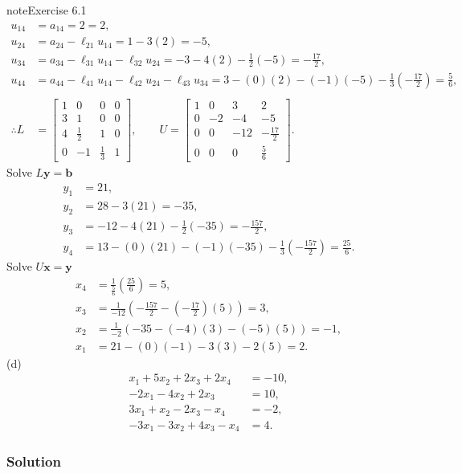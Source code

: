 \documentclass[letterpaper,10pt,english]{jupyterBook}
\begin{document}
\begin{sphinxadmonition}{note}{Exercise 6.1}
\begin{align*}
    u_{14} &= a_{14} = 2 = 2, \\
    u_{24} &= a_{24} - \ell_{21} u_{14} = 1 - 3\left(2\right) = -5, \\
    u_{34} &= a_{34} - \ell_{31} u_{14} - \ell_{32} u_{24} = -3 - 4\left(2\right) - \frac{1}{2}\left(-5\right) = - \frac{17}{2}, \\
    u_{44} &= a_{44} - \ell_{41} u_{14} - \ell_{42} u_{24} - \ell_{43} u_{34} = 3 - \left(0\right)\left(2\right) - \left(-1\right)\left(-5\right) - \frac{1}{3}\left(- \frac{17}{2}\right) = \frac{5}{6}, \\
    \\
    \therefore L &= \left[\begin{matrix}1 & 0 & 0 & 0\\3 & 1 & 0 & 0\\4 & \frac{1}{2} & 1 & 0\\0 & -1 & \frac{1}{3} & 1\end{matrix}\right], \qquad
    U = \left[\begin{matrix}1 & 0 & 3 & 2\\0 & -2 & -4 & -5\\0 & 0 & -12 & - \frac{17}{2}\\0 & 0 & 0 & \frac{5}{6}\end{matrix}\right].
\end{align*}
\sphinxAtStartPar
Solve \(L \mathbf{{y}} = \mathbf{{b}}\)
\begin{align*}
    y_{1} &= 21, \\
    y_{2} &= 28 - 3\left(21\right) = -35, \\
    y_{3} &= -12 - 4\left(21\right) - \frac{1}{2}\left(-35\right) = - \frac{157}{2}, \\
    y_{4} &= 13 - \left(0\right)\left(21\right) - \left(-1\right)\left(-35\right) - \frac{1}{3}\left(- \frac{157}{2}\right) = \frac{25}{6}.
\end{align*}
\sphinxAtStartPar
Solve \(U \mathbf{{x}} = \mathbf{{y}}\)
\begin{align*}
    x_{4} &= \frac{1}{\frac{5}{6}}\left(\frac{25}{6}\right) = 5, \\
    x_{3} &= \frac{1}{-12}\left(- \frac{157}{2} - \left(- \frac{17}{2}\right)\left(5\right)\right) = 3, \\
    x_{2} &= \frac{1}{-2}\left(-35 - \left(-4\right)\left(3\right) - \left(-5\right)\left(5\right)\right) = -1, \\
    x_{1} &= 21 - \left(0\right)\left(-1\right) - 3\left(3\right) - 2\left(5\right) = 2.
\end{align*}
\sphinxAtStartPar
(d)
\begin{align*}
        x_1 + 5 x_2 + 2 x_3 + 2 x_4 &= -10,\\
    - 2 x_1 - 4 x_2 + 2 x_3         &=  10,\\
      3 x_1 +   x_2 - 2 x_3 -   x_4 &= -2,\\
    - 3 x_1 - 3 x_2 + 4 x_3 -   x_4 &=  4.
\end{align*}\subsubsection*{Solution}


\end{sphinxadmonition}
\end{document}

